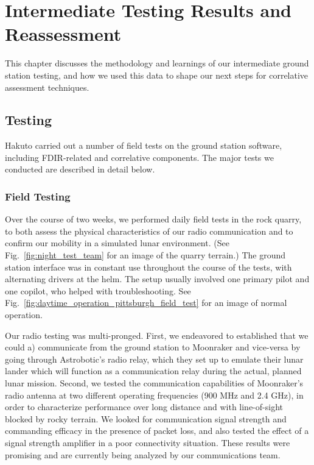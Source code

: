 \chapter{Intermediate Testing Results and Reassessment}

This chapter discusses the methodology and learnings of our intermediate ground station testing, and how we used this data to shape our next steps for correlative assessment techniques.

\section{Testing}

Hakuto carried out a number of field tests on the ground station software, including FDIR-related and correlative components. The major tests we conducted are described in detail below.

\subsection{Field Testing}

Over the course of two weeks, we performed daily field tests in the rock quarry, to both assess the physical characteristics of our radio communication and to confirm our mobility in a simulated lunar environment. (See Fig.~\ref{fig:night_test_team} for an image of the quarry terrain.) The ground station interface was in constant use throughout the course of the tests, with alternating drivers at the helm. The setup usually involved one primary pilot and one copilot, who helped with troubleshooting. See Fig.~\ref{fig:daytime_operation_pittsburgh_field_test} for an image of normal operation.

Our radio testing was multi-pronged. First, we endeavored to established that we could a) communicate from the ground station to Moonraker and vice-versa by going through Astrobotic's radio relay, which they set up to emulate their lunar lander which will function as a communication relay during the actual, planned lunar mission. Second, we tested the communication capabilities of Moonraker's radio antenna at two different operating frequencies (900 MHz and 2.4 GHz), in order to characterize performance over long distance and with line-of-sight blocked by rocky terrain. We looked for communication signal strength and commanding efficacy in the presence of packet loss, and also tested the effect of a signal strength amplifier in a poor connectivity situation. These results were promising and are currently being analyzed by our communications team.

